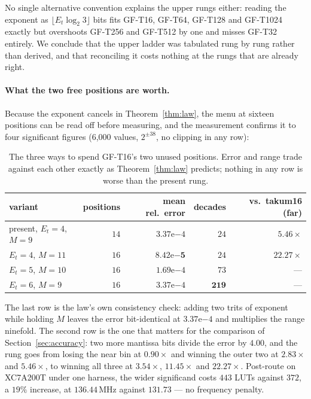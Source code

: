 \documentclass[11pt]{article}
\theoremstyle{definition}
\begin{document}
No single alternative convention explains the upper rungs either: reading the
exponent as $\lfloor E_t\log_2 3\rfloor$ bits fits GF-T16, GF-T64, GF-T128 and
GF-T1024 exactly but overshoots GF-T256 and GF-T512 by one and misses GF-T32
entirely. We conclude that the upper ladder was tabulated rung by rung rather than
derived, and that reconciling it costs nothing at the rungs that are already
right.

\paragraph{What the two free positions are worth.} Because the exponent cancels
in Theorem~\ref{thm:law}, the menu at sixteen positions can be read off before
measuring, and the measurement confirms it to four significant figures
(6{,}000 values, $2^{\pm 38}$, no clipping in any row):

\begin{table}[t]\centering
\caption{The three ways to spend GF-T16's two unused positions. Error and range
trade against each other exactly as Theorem~\ref{thm:law} predicts; nothing in
any row is worse than the present rung.}
\label{tab:gft16-fill}
\begin{tabular}{lrrrr}
\toprule
variant & positions & mean rel.\ error & decades & vs.\ takum16 (far) \\
\midrule
present, $E_t{=}4$, $M{=}9$   & $14$ & $3.37\mathrm{e}{-4}$ & $24$  & $5.46\times$ \\
$E_t{=}4$, $M{=}11$           & $16$ & $\mathbf{8.42\mathrm{e}{-5}}$ & $24$ & $\mathbf{22.27\times}$ \\
$E_t{=}5$, $M{=}10$           & $16$ & $1.69\mathrm{e}{-4}$ & $73$  & --- \\
$E_t{=}6$, $M{=}9$            & $16$ & $3.37\mathrm{e}{-4}$ & $\mathbf{219}$ & --- \\
\bottomrule
\end{tabular}
\end{table}

The last row is the law's own consistency check: adding two trits of exponent
while holding $M$ leaves the error bit-identical at $3.37\mathrm{e}{-4}$ and
multiplies the range ninefold. The second row is the one that matters for the
comparison of Section~\ref{sec:accuracy}: two more mantissa bits divide the error
by $4.00$, and the rung goes from losing the near bin at $0.90\times$ and winning
the outer two at $2.83\times$ and $5.46\times$, to winning all three at
$3.54\times$, $11.45\times$ and $22.27\times$. Post-route on XC7A200T under one
harness, the wider significand costs $443$ LUTs against $372$, a $19\%$ increase,
at $136.44$\,MHz against $131.73$ --- no frequency penalty.
\end{document}
